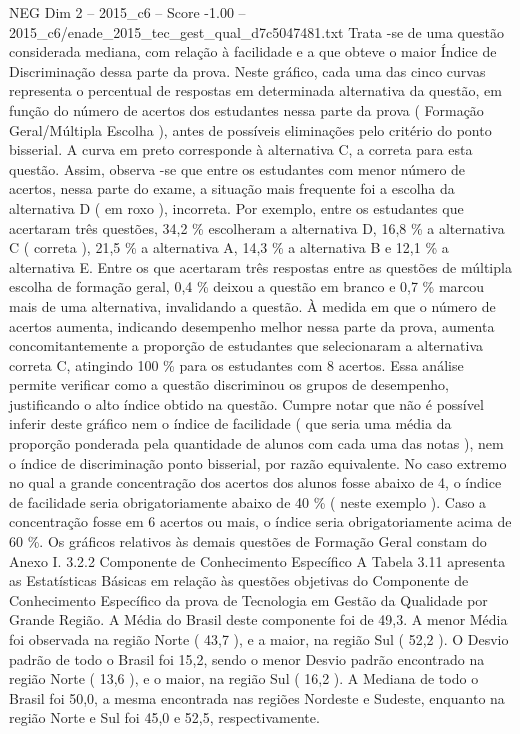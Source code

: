\begin{textsample}{NEG Dim 2 – 2015\_c6 – Score -1.00 – 2015\_c6/enade\_2015\_tec\_gest\_qual\_d7c5047481.txt}
Trata -se de uma questão considerada mediana, com relação à facilidade e a que obteve o maior Índice de Discriminação dessa parte da prova.
Neste gráfico, cada uma das cinco curvas representa o percentual de respostas em determinada alternativa da questão, em função do número de acertos dos estudantes nessa parte da prova ( Formação Geral/Múltipla Escolha ), antes de possíveis eliminações pelo critério do ponto bisserial.
A curva em preto corresponde à alternativa C, a correta para esta questão.
Assim, observa -se que entre os estudantes com menor número de acertos, nessa parte do exame, a situação mais frequente foi a escolha da alternativa D ( em roxo ), incorreta.
Por exemplo, entre os estudantes que acertaram três questões, 34,2 \% escolheram a alternativa D, 16,8 \% a alternativa C ( correta ), 21,5 \% a alternativa A, 14,3 \% a alternativa B e 12,1 \% a alternativa E.
Entre os que acertaram três respostas entre as questões de múltipla escolha de formação geral, 0,4 \% deixou a questão em branco e 0,7 \% marcou mais de uma alternativa, invalidando a questão.
À medida em que o número de acertos aumenta, indicando desempenho melhor nessa parte da prova, aumenta concomitantemente a proporção de estudantes que selecionaram a alternativa correta C, atingindo 100 \% para os estudantes com 8 acertos.
Essa análise permite verificar como a questão discriminou os grupos de desempenho, justificando o alto índice obtido na questão.
Cumpre notar que não é possível inferir deste gráfico nem o índice de facilidade ( que seria uma média da proporção ponderada pela quantidade de alunos com cada uma das notas ), nem o índice de discriminação ponto bisserial, por razão equivalente.
No caso extremo no qual a grande concentração dos acertos dos alunos fosse abaixo de 4, o índice de facilidade seria obrigatoriamente abaixo de 40 \% ( neste exemplo ).
Caso a concentração fosse em 6 acertos ou mais, o índice seria obrigatoriamente acima de 60 \%.
Os gráficos relativos às demais questões de Formação Geral constam do Anexo I. 3.2.2 Componente de Conhecimento Específico A Tabela 3.11 apresenta as Estatísticas Básicas em relação às questões objetivas do Componente de Conhecimento Específico da prova de Tecnologia em Gestão da Qualidade por Grande Região.
A Média do Brasil deste componente foi de 49,3.
A menor Média foi observada na região Norte ( 43,7 ), e a maior, na região Sul ( 52,2 ).
O Desvio padrão de todo o Brasil foi 15,2, sendo o menor Desvio padrão encontrado na região Norte ( 13,6 ), e o maior, na região Sul ( 16,2 ).
A Mediana de todo o Brasil foi 50,0, a mesma encontrada nas regiões Nordeste e Sudeste, enquanto na região Norte e Sul foi 45,0 e 52,5, respectivamente.

\end{textsample}
